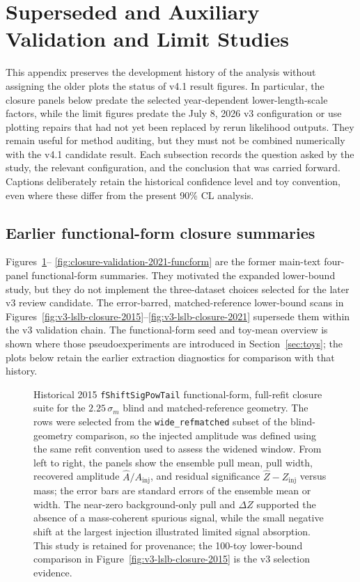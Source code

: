 \section{Superseded and Auxiliary Validation and Limit Studies}
\label{app:prior-validation-results}

This appendix preserves the development history of the analysis without assigning the
older plots the status of v4.1 result figures. In particular, the closure panels below
predate the selected year-dependent lower-length-scale factors, while the limit figures
predate the July 8, 2026 v3 configuration or use plotting repairs that had not yet been
replaced by rerun likelihood outputs. They remain useful for method auditing, but they
must not be combined numerically with the v4.1 candidate result. Each subsection records the
question asked by the study, the relevant configuration, and the conclusion that was
carried forward. Captions deliberately retain the historical confidence level and toy
convention, even where these differ from the present 90\% CL analysis.

\subsection{Earlier functional-form closure summaries}

Figures~\ref{fig:closure-validation-2015-funcform}--%
\ref{fig:closure-validation-2021-funcform} are the former main-text four-panel
functional-form summaries. They motivated the expanded lower-bound study, but they do
not implement the three-dataset choices selected for the later v3 review candidate.
The error-barred, matched-reference lower-bound scans in
Figures~\ref{fig:v3-lslb-closure-2015}--\ref{fig:v3-lslb-closure-2021} supersede
them within the v3 validation chain. The functional-form seed and toy-mean overview
is shown where those pseudoexperiments are introduced in
Section~\ref{sec:toys}; the plots below retain the earlier extraction
diagnostics for comparison with that history.

\begin{figure}[p]
\centering
{}
\caption{Historical 2015 \texttt{fShiftSigPowTail} functional-form, full-refit closure
suite for the $2.25\,\sigma_m$ blind and matched-reference geometry. The rows were
selected from the \texttt{wide\_refmatched} subset of the blind-geometry comparison,
so the injected amplitude was defined using the same refit convention used to assess
the widened window. From left to right, the panels show the ensemble pull mean, pull
width, recovered amplitude $\hat A/A_{\mathrm{inj}}$, and residual significance
$\hat Z-Z_{\mathrm{inj}}$ versus mass; the error bars are standard errors of the
ensemble mean or width. The near-zero background-only pull and $\Delta Z$ supported
the absence of a mass-coherent spurious signal, while the small negative shift at the
largest injection illustrated limited signal absorption. This study is retained for
provenance; the 100-toy lower-bound comparison in
Figure~\ref{fig:v3-lslb-closure-2015} is the v3 selection evidence.}
\label{fig:closure-validation-2015-funcform}
\end{figure}

